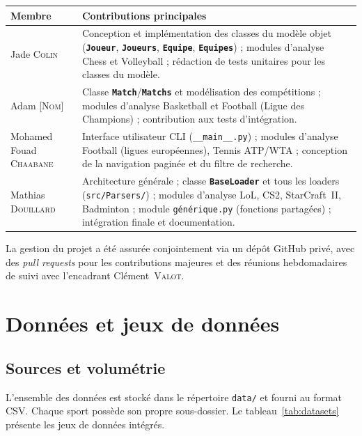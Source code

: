 \documentclass[12pt,a4paper]{article}
\newcommand{\fichier}[1]{\texttt{#1}}
\newcommand{\classe}[1]{\texttt{\textbf{#1}}}
\begin{document}
\begin{center}
\begin{tabularx}{\textwidth}{lX}
  \toprule
  \textbf{Membre} & \textbf{Contributions principales} \\
  \midrule
  Jade \textsc{Colin}
    & Conception et implémentation des classes du modèle objet
      (\classe{Joueur}, \classe{Joueurs}, \classe{Equipe}, \classe{Equipes}) ;
      modules d'analyse Chess et Volleyball ; rédaction de tests unitaires
      pour les classes du modèle. \\[0.3cm]
  Adam \textsc{[Nom]}
    & Classe \classe{Match}/\classe{Matchs} et modélisation des compétitions ;
      modules d'analyse Basketball et Football (Ligue des Champions) ;
      contribution aux tests d'intégration. \\[0.3cm]
  Mohamed Fouad \textsc{Chaabane}
    & Interface utilisateur CLI (\fichier{\_\_main\_\_.py}) ;
      modules d'analyse Football (ligues européennes), Tennis ATP/WTA ;
      conception de la navigation paginée et du filtre de recherche. \\[0.3cm]
  Mathias \textsc{Douillard}
    & Architecture générale ; classe \classe{BaseLoader} et tous les loaders
      (\fichier{src/Parsers/}) ; modules d'analyse LoL, CS2, StarCraft~II,
      Badminton ; module \fichier{générique.py} (fonctions partagées) ;
      intégration finale et documentation. \\
  \bottomrule
\end{tabularx}
\end{center}

La gestion du projet a été assurée conjointement via un dépôt GitHub privé,
avec des \textit{pull requests} pour les contributions majeures et des réunions
hebdomadaires de suivi avec l'encadrant Clément~\textsc{Valot}.

\section{Données et jeux de données}
\label{sec:donnees}

\subsection{Sources et volumétrie}

L'ensemble des données est stocké dans le répertoire \fichier{data/} et fourni
au format CSV. Chaque sport possède son propre sous-dossier. Le
tableau~\ref{tab:datasets} présente les jeux de données intégrés.
\end{document}
